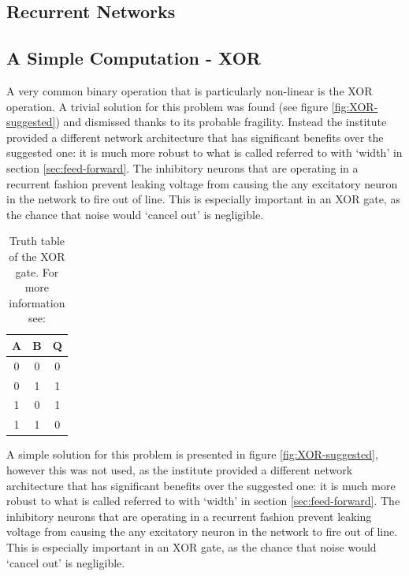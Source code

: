 \documentclass[10pt,a4paper]{article}
\begin{document}
\subsection{Recurrent Networks}

\subsection{A Simple Computation - XOR}
A very common binary operation that is particularly non-linear is the XOR
operation\cite{horowitz_hill_2020}. A trivial solution for this problem was
found (see figure \ref{fig:XOR-suggested}) and dismissed thanks to its probable
fragility. Instead the institute provided a different network architecture that
has significant benefits over the suggested one: it is much more robust to what
is called referred to with `width' in section \ref{sec:feed-forward}. The
inhibitory neurons that are operating in a recurrent fashion prevent leaking
voltage from causing the any excitatory neuron in the network to fire out of
line. This is especially important in an XOR gate, as the chance that noise
would `cancel out' is negligible.
\begin{table}[ht]
    \centering
    \begin{tabular}{c | c | c}
        A & B & Q \\ \hline
        0 & 0 & 0 \\
        0 & 1 & 1 \\
        1 & 0 & 1 \\
        1 & 1 & 0
    \end{tabular}
    \caption{Truth table of the XOR gate. For more information see:
    \cite{horowitz_hill_2020}}
    \label{tab:XOR}
\end{table}

A simple solution for this problem is presented in figure
\ref{fig:XOR-suggested}, however this was not used, as the institute provided a
different network architecture that has significant benefits over the suggested
one: it is much more robust to what is called referred to with `width' in
section \ref{sec:feed-forward}. The inhibitory neurons that are operating in a
recurrent fashion prevent leaking voltage from causing the any excitatory neuron
in the network to fire out of line. This is especially important in an XOR gate,
as the chance that noise would `cancel out' is negligible.
\end{document}
